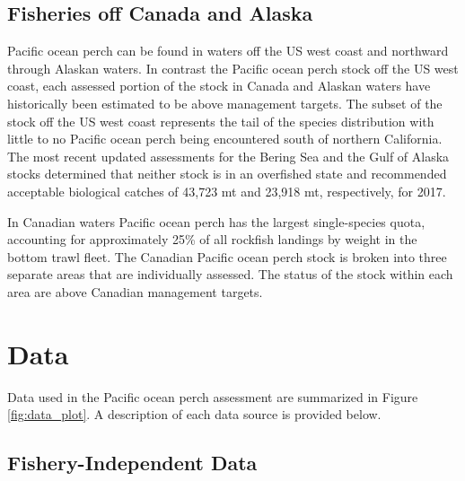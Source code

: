\documentclass[12pt,]{article}
\begin{document}
\subsection{Fisheries off Canada and
Alaska}\label{fisheries-off-canada-and-alaska}

Pacific ocean perch can be found in waters off the US west coast and
northward through Alaskan waters. In contrast the Pacific ocean perch
stock off the US west coast, each assessed portion of the stock in
Canada and Alaskan waters have historically been estimated to be above
management targets. The subset of the stock off the US west coast
represents the tail of the species distribution with little to no
Pacific ocean perch being encountered south of northern California. The
most recent updated assessments for the Bering Sea and the Gulf of
Alaska stocks determined that neither stock is in an overfished state
and recommended acceptable biological catches of 43,723 mt and 23,918
mt, respectively, for 2017.

In Canadian waters Pacific ocean perch has the largest single-species
quota, accounting for approximately 25\% of all rockfish landings by
weight in the bottom trawl fleet. The Canadian Pacific ocean perch stock
is broken into three separate areas that are individually assessed. The
status of the stock within each area are above Canadian management
targets.

\section{Data}\label{data}

Data used in the Pacific ocean perch assessment are summarized in Figure
\ref{fig:data_plot}. A description of each data source is provided
below.

\subsection{Fishery-Independent Data}\label{fishery-independent-data}
\end{document}
